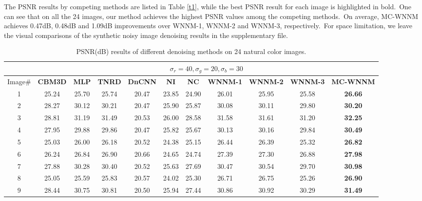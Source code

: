 \documentclass[10pt,twocolumn,letterpaper]{article}
\begin{document}
The PSNR results by competing methods are listed in Table \ref{t1}, while the best PSNR result for each image is highlighted in bold.\ One can see that on all the 24 images, our method achieves the highest PSNR values among the competing methods.\ On average, MC-WNNM achieves 0.47dB, 0.48dB and 1.09dB improvements over WNNM-1, WNNM-2 and WNNM-3, respectively.\ For space limitation, we leave the visual comparisons of the synthetic noisy image denoising results in the supplementary file.

\begin{table}
\vspace{-6mm}
\caption{PSNR(dB) results of different denoising methods on 24 natural color images.}
\vspace{0.5mm}
\label{t1}
\label{taba}
\begin{center}
\renewcommand\arraystretch{1.0}
\scriptsize
\begin{tabular}{|c||c|c|c|c|c|c|c|c|c|c|}
\hline
&\multicolumn{10}{c|}{ $\sigma_{r} = 40, \sigma_{g} = 20, \sigma_{b} = 30$}
\\
\hline
\hline
Image\#
&
\textbf{CBM3D}
&
\textbf{MLP}
&
\textbf{TNRD}
&
\textbf{DnCNN}
&
\textbf{NI}
&
\textbf{NC}
&
\textbf{WNNM-1}
&
\textbf{WNNM-2}
&
\textbf{WNNM-3}
&
\textbf{MC-WNNM}
\\
\hline
1& 25.24 & 25.70 & 25.74 & 20.47 & 23.85 & 24.90 & 26.01 & 25.95 & 25.58 & \textbf{26.66}
\\
\hline
2& 28.27 & 30.12 & 30.21 & 20.47 & 25.90 & 25.87 & 30.08 & 30.11 & 29.80 & \textbf{30.20} 
\\
\hline
3& 28.81 & 31.19 & 31.49 & 20.53 & 26.00 & 28.58 & 31.58 & 31.61 & 31.20 & \textbf{32.25}  
\\
\hline 
4& 27.95 & 29.88 & 29.86 & 20.47 & 25.82 & 25.67 & 30.13 & 30.16 & 29.84 & \textbf{30.49} 
\\
\hline
5& 25.03 & 26.00 & 26.18 & 20.52 & 24.38 & 25.15 & 26.44 & 26.39 & 25.32 & \textbf{26.82}
\\
\hline
6& 26.24 & 26.84 & 26.90 & 20.66 & 24.65 & 24.74 & 27.39 & 27.30 & 26.88 & \textbf{27.98} 
\\
\hline
7& 27.88 & 30.28 & 30.40 & 20.52 & 25.63 & 27.69 & 30.47 & 30.54 & 29.70 & \textbf{30.98} 
\\
\hline
8& 25.05 & 25.59 & 25.83 & 20.57 & 24.02 & 25.30 & 26.71 & 26.75 & 25.26 & \textbf{26.90}
\\
\hline
9& 28.44 & 30.75 & 30.81 & 20.50 & 25.94 & 27.44 & 30.86 & 30.92 & 30.29 & \textbf{31.49}
\\

\end{tabular}
\end{center}
\end{table}
\end{document}
